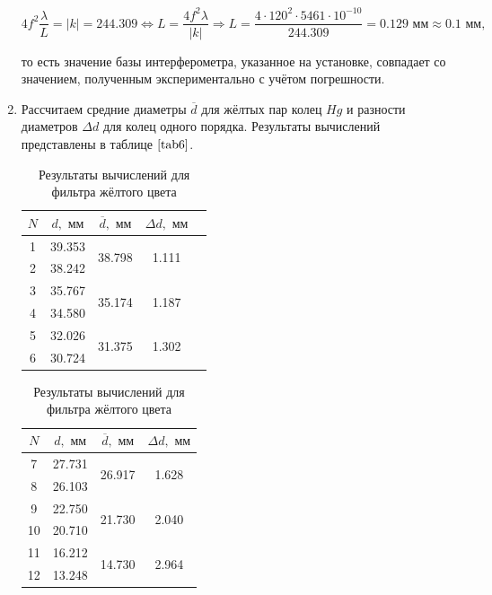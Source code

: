 \documentclass[a4paper,12pt]{article} %
\begin{document}
\begin{enumerate}
    \[ 4f^2\frac{\lambda}{L} = |k|=244.309 \Longleftrightarrow L = \frac{4f^2\lambda}{|k|} \Longrightarrow L = \frac{4\cdot120^2\cdot5461\cdot10^{-10}}{244.309} = 0.129 \text{ мм} \approx 0.1 \text{ мм}, \]

    то есть значение базы интерферометра, указанное на установке, совпадает со значением, полученным экспериментально с учётом погрешности.

    \item Рассчитаем средние диаметры $\overline{d}$ для жёлтых пар колец $Hg$ и разности диаметров $\Delta d$ для колец одного порядка. Результаты вычислений представлены в таблице $\ref{tab6}$.

    \begin{table}[h]
        \centering
        \begin{tabular}{|c|c|c|c|c|}
        \hline
    	$N$ & $d, \text{ мм}$ & $\overline{d}, \text{ мм}$ & $\Delta d, \text{ мм}$ \\ \hline
    	1 & 39.353 & \multirow{2}{*}{38.798} & \multirow{2}{*}{1.111} \\
    	2 & 38.242 & & \\ \hline
    	3 & 35.767 & \multirow{2}{*}{35.174} & \multirow{2}{*}{1.187} \\
    	4 & 34.580 & & \\ \hline
    	5 & 32.026 & \multirow{2}{*}{31.375} & \multirow{2}{*}{1.302} \\
    	6 & 30.724 & & \\ \hline
        \end{tabular}
        \begin{tabular}{|c|c|c|c|}
        \hline
    	$N$ & $d, \text{ мм}$ & $\overline{d}, \text{ мм}$ & $\Delta d, \text{ мм}$ \\ \hline
    	7 & 27.731 & \multirow{2}{*}{26.917} & \multirow{2}{*}{1.628} \\
    	8 & 26.103 & & \\ \hline
    	9 & 22.750 & \multirow{2}{*}{21.730} & \multirow{2}{*}{2.040} \\
    	10 & 20.710 & & \\ \hline
    	11 & 16.212 & \multirow{2}{*}{14.730} & \multirow{2}{*}{2.964} \\
    	12 & 13.248 & & \\ \hline
        \end{tabular}
    \caption{Результаты вычислений для фильтра жёлтого цвета}
    \label{tab6}
    \end{table}


\end{enumerate}
\end{document}
